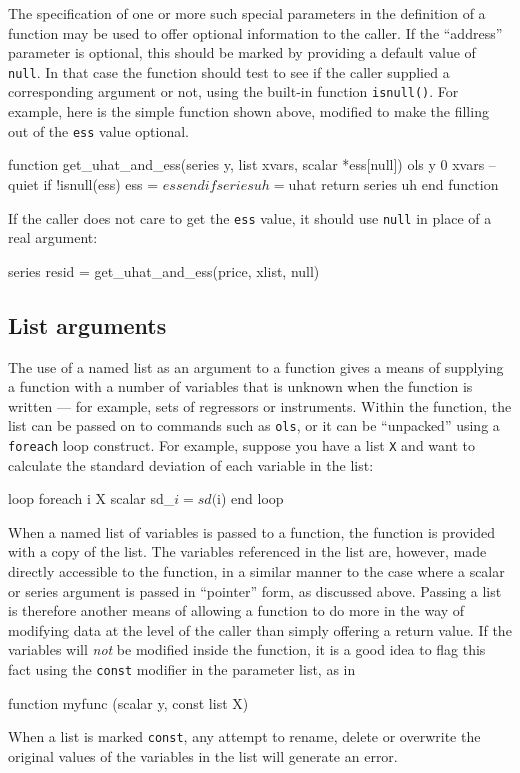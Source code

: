 The specification of one or more such special parameters in the
definition of a function may be used to offer optional information to
the caller.  If the ``address'' parameter is optional, this should be
marked by providing a default value of \texttt{null}.  In that case
the function should test to see if the caller supplied a corresponding
argument or not, using the built-in function \texttt{isnull()}.  For
example, here is the simple function shown above, modified to make the
filling out of the \texttt{ess} value optional.
%
\begin{code}
      function get_uhat_and_ess(series y, list xvars, scalar *ess[null])
        ols y 0 xvars --quiet
        if !isnull(ess) 
           ess = $ess
        endif
        series uh = $uhat
        return series uh
      end function
\end{code}
%
If the caller does not care to get the \texttt{ess} value, it should
use \texttt{null} in place of a real argument:
%
\begin{code}
      series resid = get_uhat_and_ess(price, xlist, null)
\end{code}

\subsection{List arguments}

The use of a named list as an argument to a function gives a means of
supplying a function with a number of variables that is unknown when
the function is written --- for example, sets of regressors or
instruments.  Within the function, the list can be passed on to
commands such as \texttt{ols}, or it can be ``unpacked'' using a
\texttt{foreach} loop construct.  For example, suppose you have a list
\texttt{X} and want to calculate the standard deviation of each
variable in the list:
%
\begin{code}
     loop foreach i X
        scalar sd_$i = sd($i)
     end loop
\end{code}

When a named list of variables is passed to a function, the function
is provided with a copy of the list.  The variables referenced in the
list are, however, made directly accessible to the function, in a
similar manner to the case where a scalar or series argument is passed
in ``pointer'' form, as discussed above.  Passing a list is therefore
another means of allowing a function to do more in the way of
modifying data at the level of the caller than simply offering a
return value.  If the variables will \textit{not} be modified inside
the function, it is a good idea to flag this fact using the
\texttt{const} modifier in the parameter list, as in
%
\begin{code}
     function myfunc (scalar y, const list X)
\end{code}
%
When a list is marked \texttt{const}, any attempt to rename, delete
or overwrite the original values of the variables in the list will
generate an error.


